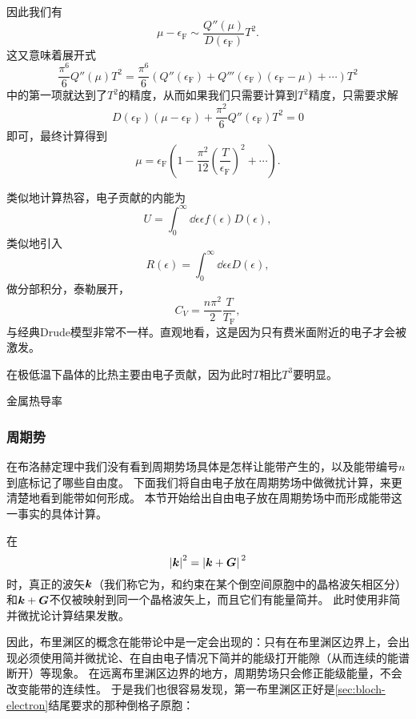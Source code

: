 因此我们有
\[
    \mu - \epsilon_\text{F} \sim \frac{Q''(\mu)}{D(\epsilon_\text{F})} T^2.
\]
这又意味着展开式
\[
    \frac{\pi^6}{6} Q''(\mu) T^2 = \frac{\pi^6}{6} \left( Q''(\epsilon_\text{F}) + Q'''(\epsilon_\text{F}) (\epsilon_\text{F} - \mu) + \cdots \right) T^2
\]
中的第一项就达到了$T^2$的精度，从而如果我们只需要计算到$T^2$精度，只需要求解
\[
    D(\epsilon_\text{F}) (\mu - \epsilon_\text{F}) + \frac{\pi^2}{6} Q''(\epsilon_\text{F}) T^2 = 0
\]
即可，最终计算得到
\begin{equation}
    \mu = \epsilon_\text{F} \left( 1 - \frac{\pi^2}{12} \left( \frac{T}{\epsilon_\text{F}} \right)^2 + \cdots \right).
\end{equation}

类似地计算热容，电子贡献的内能为
\[
    U = \int_0^\infty \dd{\epsilon} \epsilon f(\epsilon) D(\epsilon),
\]
类似地引入
\[
    R(\epsilon) = \int_0^\infty \dd{\epsilon} \epsilon D(\epsilon),
\]
做分部积分，泰勒展开，
\begin{equation}
    C_V = \frac{n \pi^2}{2} \frac{T}{T_\text{F}},
\end{equation}
与经典Drude模型非常不一样。直观地看，这是因为只有费米面附近的电子才会被激发。

在极低温下晶体的比热主要由电子贡献，因为此时$T$相比$T^3$要明显。

金属热导率

\subsubsection{周期势}

在布洛赫定理中我们没有看到周期势场具体是怎样让能带产生的，以及能带编号$n$到底标记了哪些自由度。
下面我们将自由电子放在周期势场中做微扰计算，来更清楚地看到能带如何形成。
本节开始给出自由电子放在周期势场中而形成能带这一事实的具体计算。

在
\begin{equation}
    \abs{\vb*{k}}^2 = \abs*{\vb*{k} + \vb*{G}}^2
\end{equation}
时，真正的波矢$\vb*{k}$（我们称它为，和约束在某个倒空间原胞中的晶格波矢相区分）和$\vb*{k} + \vb*{G}$不仅被映射到同一个晶格波矢上，而且它们有能量简并。
此时使用非简并微扰论计算结果发散。

因此，布里渊区的概念在能带论中是一定会出现的：只有在布里渊区边界上，会出现必须使用简并微扰论、在自由电子情况下简并的能级打开能隙（从而连续的能谱断开）等现象。
在远离布里渊区边界的地方，周期势场只会修正能级能量，不会改变能带的连续性。
于是我们也很容易发现，第一布里渊区正好是\autoref{sec:bloch-electron}结尾要求的那种倒格子原胞：

